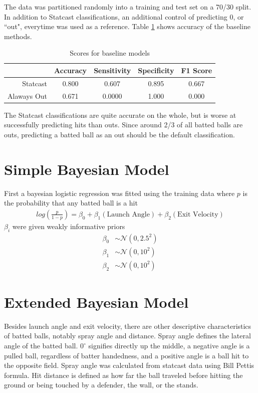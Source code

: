 \documentclass[12pt,letterpaper]{article}
\begin{document}
The data was partitioned randomly into a training and test set on a 70/30 split. In addition to Statcast classifications, an additional control of predicting 0, or ``out", everytime was used as a reference. Table \ref{tab:baseline_acc} shows accuracy of the baseline methods.

\begin{table}[!htb]
    \centering
    \begin{tabular}{|r|c|c|c|c|}
        \hline
        & Accuracy & Sensitivity & Specificity & F1 Score \\ \hline
        Statcast & 0.800 & 0.607 & 0.895 & 0.667 \\ \hline
        Alaways Out & 0.671 & 0.0000 & 1.000 & 0.000 \\ \hline
    \end{tabular}
    \caption{Scores for baseline models}
    \label{tab:baseline_acc}
\end{table}

The Statcast classifications are quite accurate on the whole, but is worse at successfully predicting hits than outs. Since around 2/3 of all batted balls are outs, predicting a batted ball as an out should be the default classification.

\section*{Simple Bayesian Model}

First a bayesian logistic regression was fitted using the training data where $p$ is the probability that any batted ball is a hit
\begin{align*}
    log(\frac{p}{1-p}) = \beta_0 + \beta_1(\text{Launch Angle}) + \beta_2(\text{Exit Velocity})
\end{align*}
$\beta_i$ were given weakly informative priors
\begin{align*}
    \beta_0 &\sim \mathcal{N}(0, 2.5^2)\\
    \beta_1 &\sim \mathcal{N}(0, 10^2)\\
    \beta_2 &\sim \mathcal{N}(0, 10^2)
\end{align*}

\section*{Extended Bayesian Model}
Besides launch angle and exit velocity, there are other descriptive characteristics of batted balls, notably spray angle and distance. Spray angle defines the lateral angle of the batted ball. $0^{\circ}$ signifies directly up the middle, a negative angle is a pulled ball, regardless of batter handedness, and a positive angle is a ball hit to the opposite field. Spray angle was calculated from statcast data using Bill Pettis formula. Hit distance is defined as how far the ball traveled before hitting the ground or being touched by a defender, the wall, or the stands. 
\end{document}
